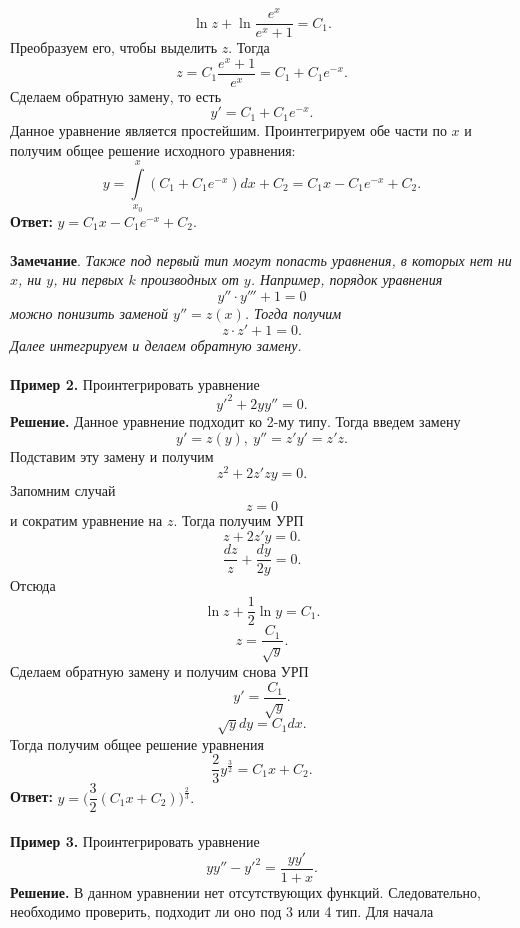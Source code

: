 \documentclass[a4paper, 12pt]{report}
\begin{document}
$$\ln z + \ln \dfrac{e^x}{e^x + 1} = C_1.$$
Преобразуем его, чтобы выделить $z$. Тогда $$z = C_1\dfrac{e^x + 1}{e^x } = C_1 + C_1e^{-x}.$$
Сделаем обратную замену, то есть $$y' = C_1 + C_1e^{-x}.$$
Данное уравнение является простейшим. Проинтегрируем обе части по $x$ и получим общее решение исходного уравнения:
$$y = \int\limits_{x_0}^x (C_1 + C_1e^{-x})dx + C_2 = C_1x - C_1e^{-x} + C_2.$$
\textbf{Ответ:} $y = C_1x - C_1e^{-x} + C_2.$\\\\
\textbf{Замечание}. \textit{Также под первый тип могут попасть уравнения, в которых нет ни $x$, ни $y$, ни первых $k$ производных от $y$. Например, порядок уравнения $$y''\cdot y''' + 1 =0$$ можно понизить заменой $y'' = z(x)$. Тогда получим $$z\cdot z' + 1 = 0.$$ Далее интегрируем и делаем обратную замену.}\\\\
\textbf{Пример 2.} Проинтегрировать уравнение $$y'^2 + 2yy'' = 0.$$
\textbf{Решение.} Данное уравнение подходит ко 2-му типу. Тогда введем замену $$y' = z(y),\ y''= z'y' = z'z.$$
Подставим эту замену и получим $$z^2 +2z'zy = 0.$$
Запомним случай $$z = 0$$ и сократим уравнение на $z$. Тогда получим УРП $$z + 2z' y = 0.$$
$$\dfrac{dz}{z} + \dfrac{dy}{2y} = 0.$$
Отсюда $$\ln z + \dfrac{1}{2}\ln y = C_1.$$
$$z = \dfrac{C_1}{\sqrt{y}}.$$
Сделаем обратную замену и получим снова УРП $$y' = \dfrac{C_1}{\sqrt{y}}.$$
$$\sqrt{y}dy = C_1dx.$$
Тогда получим общее решение уравнения $$\dfrac{2}{3}y^{\frac32} = C_1x + C_2.$$
\textbf{Ответ:} $y = \Big(\dfrac{3}{2}(C_1x + C_2)\Big)^{\frac23}.$\\\\
\textbf{Пример 3.} Проинтегрировать уравнение $$yy'' - y'^2 = \dfrac{yy'}{1+x}.$$
\textbf{Решение.} В данном уравнении нет отсутствующих функций. Следовательно, необходимо проверить, подходит ли оно под 3 или 4 тип. Для начала
\end{document}
